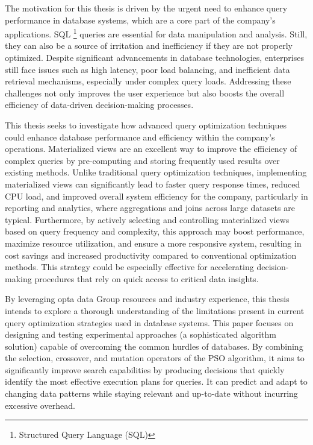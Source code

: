 The motivation for this thesis is driven by the urgent need to enhance query performance in database systems, which are a core part of the company's applications. SQL \footnote{Structured Query Language (SQL)} queries are essential for data manipulation and analysis. Still, they can also be a source of irritation and inefficiency if they are not properly optimized. Despite significant advancements in database technologies, enterprises still face issues such as high latency, poor load balancing, and inefficient data retrieval mechanisms, especially under complex query loads. Addressing these challenges not only improves the user experience but also boosts the overall efficiency of data-driven decision-making processes.\vspace{.4cm}



This thesis seeks to investigate how advanced query optimization techniques could enhance database performance and efficiency within the company's operations. Materialized views are an excellent way to improve the efficiency of complex queries by pre-computing and storing frequently used results over existing methods. Unlike traditional query optimization techniques, implementing materialized views can significantly lead to faster query response times, reduced CPU load, and improved overall system efficiency for the company, particularly in reporting and analytics, where aggregations and joins across large datasets are typical. Furthermore, by actively selecting and controlling materialized views based on query frequency and complexity, this approach may boost performance, maximize resource utilization, and ensure a more responsive system, resulting in cost savings and increased productivity compared to conventional optimization methods. This strategy could be especially effective for accelerating decision-making procedures that rely on quick access to critical data insights.\vspace{.4cm}

By leveraging opta data Group resources and industry experience, this thesis intends to explore a thorough understanding of the limitations present in current query optimization strategies used in database systems. This paper focuses on designing and testing experimental approaches (a sophisticated algorithm solution) capable of overcoming the common hurdles of databases. By combining the selection, crossover, and mutation operators of the PSO algorithm, it aims to significantly improve search capabilities by producing decisions that quickly identify the most effective execution plans for queries. It can predict and adapt to changing data patterns while staying relevant and up-to-date without incurring excessive overhead.\vspace{.4cm}





